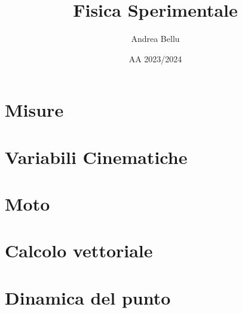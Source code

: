 \documentclass{article}
\title{Fisica Sperimentale}
\author{Andrea Bellu}
\date{AA 2023/2024}
\begin{document}
\maketitle

\tableofcontents
\newpage

\section{Misure}

\section{Variabili Cinematiche}

\section{Moto}


\section{Calcolo vettoriale}




\section{Dinamica del punto}

\end{document}
